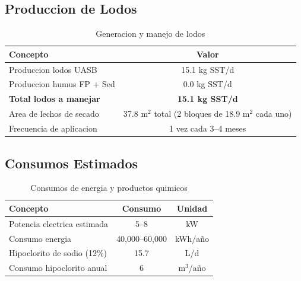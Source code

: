 \documentclass[12pt,a4paper]{article}
\begin{document}
\subsection{Produccion de Lodos}

\begin{table}[H]
\centering
\caption{Generacion y manejo de lodos}
\begin{tabular}{lc}
\toprule
\textbf{Concepto} & \textbf{Valor} \\
\midrule
Produccion lodos UASB & 15.1 kg SST/d \\
Produccion humus FP + Sed & 0.0 kg SST/d \\
\midrule
\textbf{Total lodos a manejar} & \textbf{15.1 kg SST/d} \\
Area de lechos de secado & 37.8 m$^2$ total (2 bloques de 18.9 m$^2$ cada uno) \\
Frecuencia de aplicacion & 1 vez cada 3--4 meses \\
\bottomrule
\end{tabular}
\end{table}

\subsection{Consumos Estimados}

\begin{table}[H]
\centering
\caption{Consumos de energia y productos quimicos}
\begin{tabular}{lcc}
\toprule
\textbf{Concepto} & \textbf{Consumo} & \textbf{Unidad} \\
\midrule
Potencia electrica estimada & 5--8 & kW \\
Consumo energia & 40,000--60,000 & kWh/a\~no \\
Hipoclorito de sodio (12\%) & 15.7 & L/d \\
Consumo hipoclorito anual & 6 & m$^3$/a\~no \\
\bottomrule
\end{tabular}
\end{table}

\vspace{1cm}

\begin{center}
\end{center}
\end{document}
